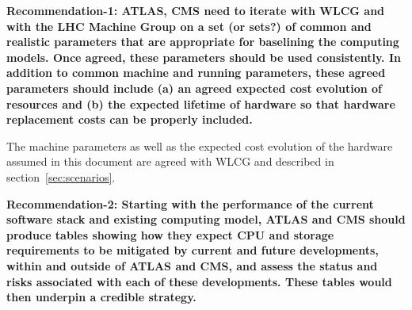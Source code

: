 \documentclass{cmspaper}
\newcommand{\B}[1]{\textbf{#1}}
\begin{document}






\B{Recommendation-1: ATLAS, CMS need to iterate with WLCG and with the LHC Machine Group on a set (or sets?) of common and realistic parameters that are appropriate for baselining the computing models. Once agreed, these parameters should be used consistently. In addition to common machine and running parameters, these agreed parameters should include (a) an agreed expected cost evolution of resources and (b) the expected lifetime of hardware so that hardware replacement costs can be properly included.}

The machine parameters as well as the expected cost evolution of the hardware assumed in this document are agreed with WLCG and described in section~\ref{sec:scenarios}.

\B{Recommendation-2: Starting with the performance of the current software stack and existing computing model, ATLAS and CMS should produce tables showing how they expect CPU and storage requirements to be mitigated by current and future developments, within and outside of ATLAS and CMS, and assess the status and risks associated with each of these developments. These tables would then underpin a credible strategy.}
\end{document}
